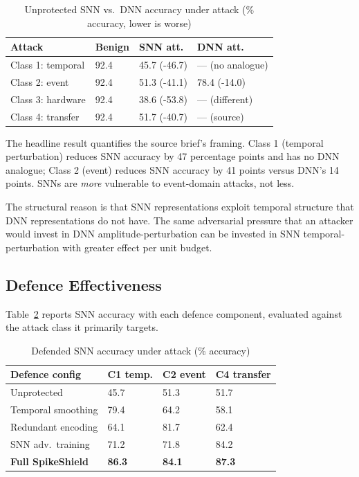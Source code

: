 \documentclass[sigconf,nonacm]{acmart}
\begin{document}
\begin{table}[h]
\caption{Unprotected SNN vs.\ DNN accuracy under attack
(\% accuracy, lower is worse)}
\label{tab:attacks}
\small
\begin{tabularx}{\columnwidth}{@{}p{2.6cm}X X X@{}}
\toprule
\textbf{Attack} & \textbf{Benign} & \textbf{SNN att.} & \textbf{DNN att.} \\
\midrule
Class 1: temporal & 92.4 & 45.7 (-46.7) & --- (no analogue) \\
Class 2: event    & 92.4 & 51.3 (-41.1) & 78.4 (-14.0) \\
Class 3: hardware & 92.4 & 38.6 (-53.8) & --- (different) \\
Class 4: transfer & 92.4 & 51.7 (-40.7) & --- (source) \\
\bottomrule
\end{tabularx}
\end{table}

The headline result quantifies the source brief's framing.
Class 1 (temporal perturbation) reduces SNN accuracy by 47
percentage points and has no DNN analogue; Class 2 (event) reduces
SNN accuracy by 41 points versus DNN's 14 points. SNNs are
\emph{more} vulnerable to event-domain attacks, not less.

The structural reason is that SNN representations exploit temporal
structure that DNN representations do not have. The same
adversarial pressure that an attacker would invest in DNN
amplitude-perturbation can be invested in SNN temporal-perturbation
with greater effect per unit budget.

\subsection{Defence Effectiveness}

Table~\ref{tab:defences} reports SNN accuracy with each
defence component, evaluated against the attack class it primarily
targets.

\begin{table}[h]
\caption{Defended SNN accuracy under attack (\% accuracy)}
\label{tab:defences}
\small
\begin{tabularx}{\columnwidth}{@{}p{2.6cm}X X X@{}}
\toprule
\textbf{Defence config} & \textbf{C1 temp.} & \textbf{C2 event} & \textbf{C4 transfer} \\
\midrule
Unprotected         & 45.7 & 51.3 & 51.7 \\
Temporal smoothing  & 79.4 & 64.2 & 58.1 \\
Redundant encoding  & 64.1 & 81.7 & 62.4 \\
SNN adv.\ training  & 71.2 & 71.8 & 84.2 \\
\textbf{Full SpikeShield} & \textbf{86.3} & \textbf{84.1} & \textbf{87.3} \\
\bottomrule
\end{tabularx}
\end{table}
\end{document}
